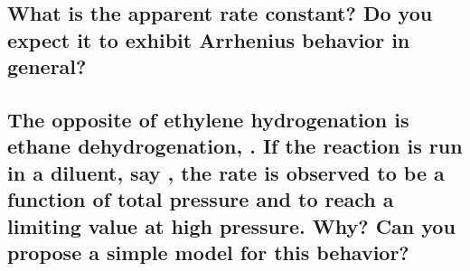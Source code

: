 \documentclass[11pt]{article}
\begin{document}
\subsection{What is the apparent rate constant?  Do you expect it to exhibit Arrhenius behavior in general?}
\label{sec:orgb34496b}

\subsection{The opposite of ethylene hydrogenation is ethane dehydrogenation, . If the reaction is run in a diluent, say , the rate is observed to be a function of total pressure and to reach a limiting value at high pressure. Why? Can you propose a simple model for this behavior?}
\label{sec:orga6671eb}
\end{document}
